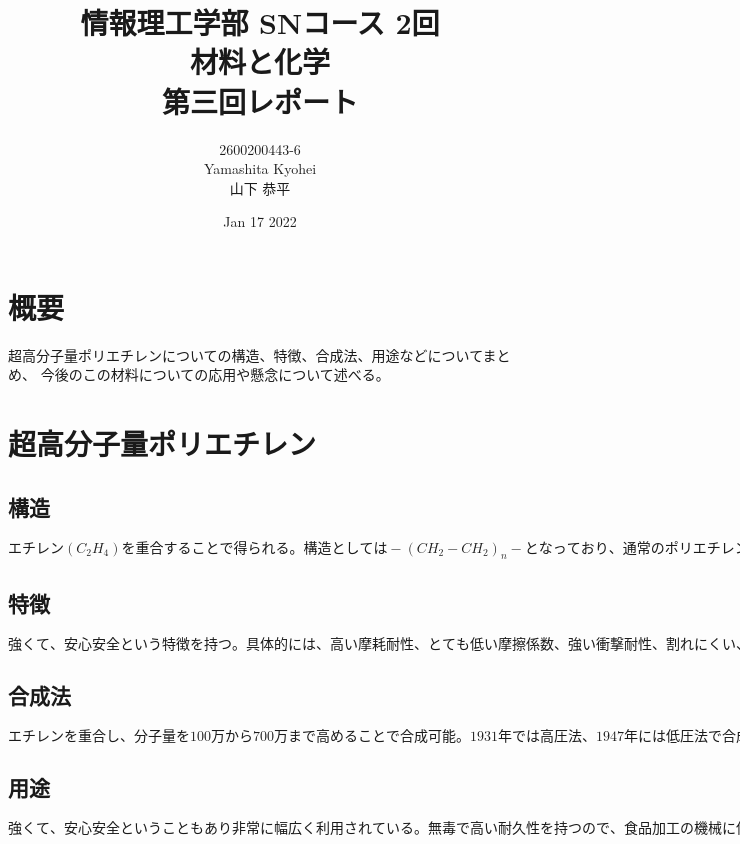 \documentclass[dvipdfmx,autodetect-engine,titlepage]{jsarticle}
\title{情報理工学部 SNコース 2回\\
材料と化学\\
第三回レポート}
\author{2600200443-6\\Yamashita Kyohei\\山下 恭平}
\date{Jan 17 2022}
\begin{document}
\maketitle

\section{概要}
超高分子量ポリエチレンについての構造、特徴、合成法、用途などについてまとめ、
今後のこの材料についての応用や懸念について述べる。

\section{超高分子量ポリエチレン}

\subsection{構造}
\begin{math}
  エチレン(C_2H_4)を重合することで得られる。構造としては-(CH_2-CH_2)_n-となっており、
  通常のポリエチレンの分子量が20万から30万なのに対して、超高分子量ポリエチレン
  では100万から700万まで高めている。^{(1)}
\end{math}

\subsection{特徴}
\begin{math}
  強くて、安心安全という特徴を持つ。具体的には、高い摩耗耐性、とても低い摩擦係数
、強い衝撃耐性、割れにくい、高い非粘着性、生理的に無毒、優れた薬品耐性、ほとんど
吸水しないなどが特性として挙げられる。^{(2)}
\end{math}

\subsection{合成法}
\begin{math}
  エチレンを重合し、分子量を100万から700万まで高めることで合成可能。1931年では
高圧法、1947年には低圧法で合成され、、1952年にはチーグラー触媒により常温
常圧での合成が可能となった。^{(3)}
\end{math}

\subsection{用途}
\begin{math}
  強くて、安心安全ということもあり非常に幅広く利用されている。無毒で高い耐久性
を持つので、食品加工の機械に使用され、低い摩擦係数に衝撃耐性を備えているので
スノーモービルの部品やスキー、ボーリングのレーンにも使用される、さらに、耐水性
、薬品耐性を持っているのでケミカルポンプやガスケットとしても利用されており、
食品機械、建設機械、スポーツ用品、化学用品など非常に幅広い分野で使用されている。^{(4)}
\end{math}
\end{document}

